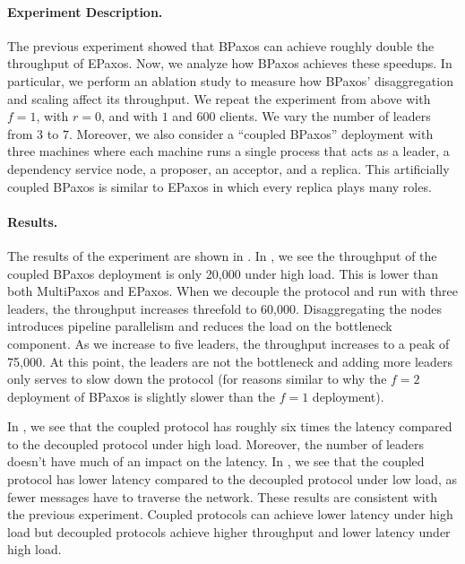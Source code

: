 \paragraph{Experiment Description.}
The previous experiment showed that BPaxos can achieve roughly double the
throughput of EPaxos. Now, we analyze how BPaxos achieves these speedups. In
particular, we perform an ablation study to measure how BPaxos' disaggregation
and scaling affect its throughput. We repeat the experiment from above with
$f=1$, with $r=0$, and with $1$ and $600$ clients. We vary the number of
leaders from $3$ to $7$. Moreover, we also consider a ``coupled BPaxos''
deployment with three machines where each machine runs a single process that
acts as a leader, a dependency service node, a proposer, an acceptor, and a
replica. This artificially coupled BPaxos is similar to EPaxos in which every
replica plays many roles.


\paragraph{Results.}
The results of the experiment are shown in . In
, we see the throughput of the coupled
BPaxos deployment is only 20,000 under high load. This is lower than both
MultiPaxos and EPaxos. When we decouple the protocol and run with three
leaders, the throughput increases threefold to 60,000. Disaggregating the nodes
introduces pipeline parallelism and reduces the load on the bottleneck
component. As we increase to five leaders, the throughput increases to a peak
of 75,000. At this point, the leaders are not the bottleneck and adding more
leaders only serves to slow down the protocol (for reasons similar to why the
$f=2$ deployment of BPaxos is slightly slower than the $f=1$ deployment).

In , we see that the coupled protocol has
roughly six times the latency compared to the decoupled protocol under high
load. Moreover, the number of leaders doesn't have much of an impact on the
latency. In , we see that the coupled
protocol has lower latency compared to the decoupled protocol under low load,
as fewer messages have to traverse the network. These results are consistent
with the previous experiment. Coupled protocols can achieve lower latency under
high load but decoupled protocols achieve higher throughput and lower latency
under high load.

